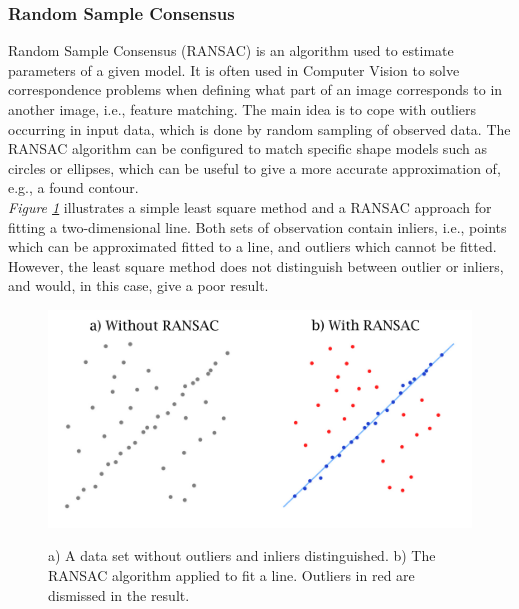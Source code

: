 \subsubsection{Random Sample Consensus}
Random Sample Consensus (RANSAC) \cite{Fischler} is an algorithm used to estimate parameters of a given model. It is often used in Computer Vision to solve correspondence problems when defining what part of an image corresponds to in another image, i.e., feature matching.  The main idea is to cope with outliers occurring in input data, which is done by random sampling of observed data. The RANSAC algorithm can be configured to match specific shape models such as circles or ellipses, which can be useful to give a more accurate approximation of, e.g., a found contour.\\

\noindent \textit{Figure \ref{fig:ransac chart}} illustrates a simple least square method and a RANSAC approach for fitting a two-dimensional line. Both sets of observation contain inliers, i.e., points which can be approximated fitted to a line, and outliers which cannot be fitted. However, the least square method does not distinguish between outlier or inliers, and would, in this case, give a poor result.\\

\begin{figure}[htbp]
    \begin{minipage}{\textwidth}
        \centering
        \includegraphics[width=0.8\linewidth]{figures/PDF/RANSAC.pdf}\\
        \caption{ a) A data set without outliers and inliers distinguished\protect\footnotemark. b) The RANSAC algorithm applied to fit a line. Outliers in red are dismissed in the result\protect\footnotemark.}
        \label{fig:ransac chart}
    \end{minipage}
\end{figure}

